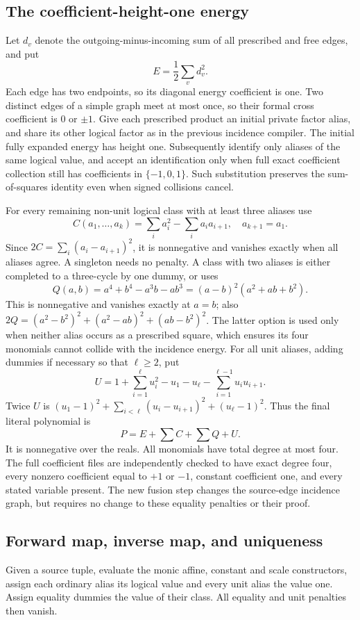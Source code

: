 \subsection{The coefficient-height-one energy}
Let $d_v$ denote the outgoing-minus-incoming sum of all prescribed and
free edges, and put
\[
 E=\frac12\sum_vd_v^2.
\]
Each edge has two endpoints, so its diagonal energy coefficient is one.
Two distinct edges of a simple graph meet at most once, so their formal
cross coefficient is $0$ or $\pm1$. Give each prescribed product an
initial private factor alias, and share its other logical factor as in the
previous incidence compiler. The initial fully expanded energy has height
one. Subsequently identify only aliases of the same logical value, and
accept an identification only when full exact coefficient collection
still has coefficients in $\{-1,0,1\}$. Such substitution preserves the
sum-of-squares identity even when signed collisions cancel.

For every remaining non-unit logical class with at least three aliases use
\[
 C(a_1,\ldots,a_k)=\sum_i a_i^2-\sum_i a_i a_{i+1},\quad a_{k+1}=a_1.
\]
Since $2C=\sum_i(a_i-a_{i+1})^2$, it is nonnegative and vanishes exactly
when all aliases agree. A singleton needs no penalty. A class with two
aliases is either completed to a three-cycle by one dummy, or uses
\[
 Q(a,b)=a^4+b^4-a^3b-ab^3=(a-b)^2(a^2+ab+b^2).
\]
This is nonnegative and vanishes exactly at $a=b$; also
$2Q=(a^2-b^2)^2+(a^2-ab)^2+(ab-b^2)^2$. The latter option is used only
when neither alias occurs as a prescribed square, which ensures its four
monomials cannot collide with the incidence energy. For all unit aliases,
adding dummies if necessary so that $\ell\ge2$, put
\[
 U=1+\sum_{i=1}^{\ell}u_i^2-u_1-u_\ell-
       \sum_{i=1}^{\ell-1}u_iu_{i+1}.
\]
Twice $U$ is $(u_1-1)^2+\sum_{i<\ell}(u_i-u_{i+1})^2+(u_\ell-1)^2$.
Thus the final literal polynomial is
\[
 \boxed{P=E+\sum C+\sum Q+U.}                         \tag{2}
\]
It is nonnegative over the reals. All monomials have total degree at most
four. The full coefficient files are independently checked to have exact
degree four, every nonzero coefficient equal to $+1$ or $-1$, constant
coefficient one, and every stated variable present. The new fusion step
changes the source-edge incidence graph, but requires no change to these
equality penalties or their proof.

\subsection{Forward map, inverse map, and uniqueness}
Given a source tuple, evaluate the monic affine, constant and scale
constructors, assign each ordinary alias its logical value and every unit
alias the value one. Assign equality dummies the value of their class.
All equality and unit penalties then vanish.

